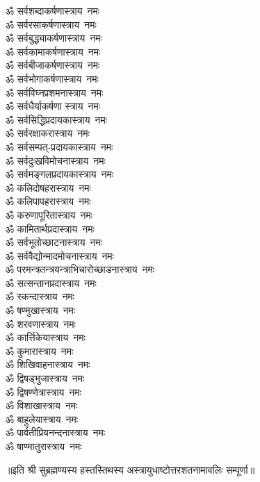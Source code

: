 \begin{flushleft}
\begin{multicols}{2}
ॐ सर्वशब्दाकर्षणास्त्राय~नमः\\
ॐ सर्वरसाकर्षणास्त्राय~नमः\\
ॐ सर्वबुद्ध्याकर्षणास्त्राय~नमः\\
ॐ सर्वकामाकर्षणास्त्राय~नमः\\
ॐ सर्वबीजाकर्षणास्त्राय~नमः\hfill{}\\
ॐ सर्वभोगाकर्षणास्त्राय~नमः\\
ॐ सर्वविघ्नप्रशमनास्त्राय~नमः\\
ॐ सर्वधैर्याकर्षणा स्त्राय~नमः\\
ॐ सर्वसिद्धिप्रदायकास्त्राय~नमः\\
ॐ सर्वरक्षाकरास्त्राय~नमः\\
ॐ सर्वसम्पत्-प्रदायकास्त्राय~नमः\\
ॐ सर्वदुःखविमोचनास्त्राय~नमः\\
ॐ सर्वमङ्गलप्रदायकास्त्राय~नमः\\
ॐ कलिदोषहरास्त्राय~नमः\\
ॐ कलिपापहरास्त्राय~नमः\hfill{}\\
ॐ करुणापूरितास्त्राय~नमः\\
ॐ कामितार्थप्रदास्त्राय~नमः\\
ॐ सर्वभूतोच्छाटनास्त्राय~नमः \\
ॐ सर्ववैद्योन्मादमोचनास्त्राय~नमः \\
ॐ परमन्त्रतन्त्रयन्त्राभिचारो\-च्छाडनास्त्राय~नमः\\
ॐ सत्सन्तानप्रदास्त्राय~नमः\\
ॐ स्कन्दास्त्राय~नमः\\
ॐ षण्मुखास्त्राय~नमः\\
ॐ शरवणास्त्राय~नमः\\
ॐ कार्त्तिकेयास्त्राय~नमः\hfill{}\\
ॐ कुमारास्त्राय~नमः\\
ॐ शिखिवाहनास्त्राय~नमः\\
ॐ द्विषड्भुजास्त्राय~नमः\\
ॐ द्विषण्णेत्रास्त्राय~नमः\\
ॐ विशाखास्त्राय~नमः\\
ॐ बाहुलेयास्त्राय~नमः\\
ॐ पार्वतीप्रियनन्दनास्त्राय~नमः\\
ॐ षाण्मातुरास्त्राय~नमः\\
\end{multicols}
\end{flushleft}
॥इति श्री सुब्रह्मण्यस्य हस्तस्तिथस्य अस्त्रायुधाष्टोत्तरशतनामावलिः सम्पूर्णा॥
